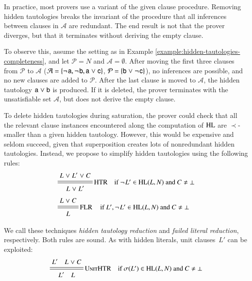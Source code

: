 \begin{rep}
   \newcommand{\aset}{\mathcal{A}}
   \newcommand{\pset}{\mathcal{P}}
   
   In practice, most provers use a variant of the given clause procedure.
   Removing hidden tautologies breaks the invariant of the procedure that all
   inferences between clauses in $\aset$ are redundant. The end result is not
   that the prover diverges, but that it terminates without deriving the empty
   clause.

   To observe this, assume the setting as in Example
   \ref{example:hidden-tautologies-completeness}, and let $\pset=N$ and
   $\aset=\emptyset$. After moving the first three clauses from $\pset$ to
   $\aset$ ($\aset = \{ \negpredlit{\cst{a}}, \negpredlit{\cst{b}}, \pospredlit{\cst{a}} \cor
   \pospredlit{\cst{c}} \}$, $\pset = \{\pospredlit{\cst{b}} \cor \negpredlit{\cst{c}}\}$), 
   no inferences are possible, and no new clauses are added to $\pset$. After the last clause
   is moved to $\aset$, the hidden tautology ${\mathsf{a}} \mathrel{\lor} {\mathsf{b}}$
   is produced. If it is deleted, the prover terminates with the unsatisfiable set $\aset$,
   but does not derive the empty clause. 
\end{rep}

To delete hidden tautologies during saturation, the prover could check that all
the relevant clause instances encountered along the computation of $\mathrm{HL}$ are
$\prec$-smaller than a given hidden tautology. However, this would be expensive
and seldom succeed, given that superposition creates lots of nonredundant
hidden tautologies. Instead, we propose to simplify hidden tautologies using the
following rules:
%
%
\begin{align*}
   & \namedsimpsc{HTR}{L \cor L' \cor C}{L \cor L'}{\neglit{L'} \in \HL(L, N) \text{~and~} C \not= \bot} \\[.5\jot]
   & \namedsimpsc{\rlap{FLR}\phantom{HTR}}{L \cor C}{L}{L',\neglit{L'} \in \HL(L, N) \text{~and~} C \not= \bot}
\end{align*}
%

%
We call these techniques \emph{hidden tautology reduction} and \emph{failed literal
reduction}, respectively.
%
Both rules are sound.
%
As with hidden literals, unit clauses~$L'$ can be exploited:
\[\namedsimpsc{UnitHTR}{L' \quad L \cor C}{L' \quad L}{\sigmaterm{L'} \in \HL(L,N) \text{~and~} C \not= \bot}
\]


